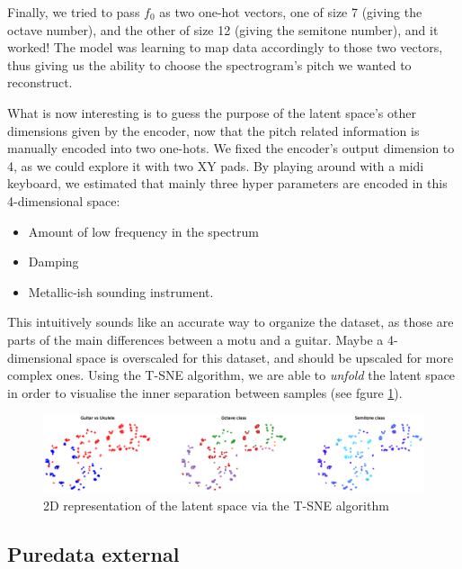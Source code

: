 \documentclass[11pt, english]{article}
\begin{document}
Finally, we tried to pass $f_0$ as two one-hot vectors, one of size 7 (giving the octave number), and the other of size 12 (giving the semitone number), and it worked! The model was learning to map data accordingly to those two vectors, thus giving us the ability to choose the spectrogram's pitch we wanted to reconstruct.\newline

What is now interesting is to guess the purpose of the latent space's other dimensions given by the encoder, now that the pitch related information is manually encoded into two one-hots. We fixed the encoder's output dimension to 4, as we could explore it with two XY pads. By playing around with a midi keyboard, we estimated that mainly three hyper parameters are encoded in this 4-dimensional space:

\begin{itemize}[noitemsep]
    \item Amount of low frequency in the spectrum
    \item Damping
    \item Metallic-ish sounding instrument.
\end{itemize}

This intuitively sounds like an accurate way to organize the dataset, as those are parts of the main differences between a motu and a guitar. Maybe a 4-dimensional space is overscaled for this dataset, and should be upscaled for more complex ones. Using the T-SNE algorithm, we are able to \textit{unfold} the latent space in order to visualise the inner separation between samples (see fgure \ref{fig:tsne}).

\begin{figure}
    \centering
    \centerline{\includegraphics[width=1.3\linewidth]{img/tsne_latent_space_guitare_uku.eps}}
    \caption{2D representation of the latent space via the T-SNE algorithm}
    \label{fig:tsne}
\end{figure}

\subsection{Puredata external}
\end{document}

